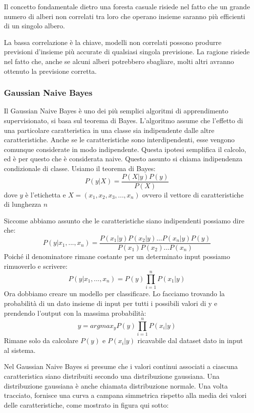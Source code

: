 \documentclass[12pt,italian]{report}
\begin{document}
Il concetto fondamentale dietro una foresta casuale risiede nel fatto che un grande numero di alberi non correlati tra loro che operano insieme saranno più efficienti di un singolo albero.

La bassa correlazione è la chiave, modelli non correlati possono produrre previsioni d'insieme più accurate di qualsiasi singola previsione. La ragione risiede nel fatto che, anche se alcuni alberi potrebbero sbagliare, molti altri avranno ottenuto la previsione corretta.
\subsubsection{Gaussian Naive Bayes}
Il Gaussian Naive Bayes è uno dei più semplici algoritmi di apprendimento supervisionato, si basa sul teorema di Bayes. L'algoritmo assume che l'effetto di una particolare caratteristica in una classe sia indipendente dalle altre caratteristiche. Anche se le caratteristiche sono interdipendenti, esse vengono comunque considerate in modo indipendente. Questa ipotesi semplifica il calcolo, ed è per questo che è considerata naive. Questo assunto si chiama indipendenza condizionale di classe.
Usiamo il teorema di Bayes:
\begin{equation}
P(y | X) = \frac{P(X | y) P(y)}{P(X)}
\end{equation}
dove $y$ è l'etichetta e $X = (x_1, x_2, x_3, ..., x_n)$ ovvero il vettore di caratteristiche di lunghezza $n$

Siccome abbiamo assunto che le caratteristiche siano indipendenti possiamo dire che:
\begin{equation}
P(y| x_1,..., x_n) = \frac{P(x_1|y) P(x_2|y)...P(x_n|y)P(y)}{P(x_1)P(x_2)...P(x_n)}
\end{equation}
Poiché il denominatore rimane costante per un determinato input possiamo rimuoverlo e scrivere:
\begin{equation}
P(y| x_1,..., x_n) = P(y) \prod_{i=1}^{n} P(x_1|y)
\end{equation}
Ora dobbiamo creare un modello per classificare. Lo facciamo trovando la probabilità di un dato insieme di input per tutti i possibili valori di y e prendendo l'output con la massima probabilità:
\begin{equation}
y = argmax_y P(y) \prod_{i=1}^{n} P(x_i|y)
\end{equation}
Rimane solo da calcolare $P(y)$ e $P(x_i|y)$ ricavabile dal dataset dato in input al sistema.

Nel Gaussian Naive Bayes si presume che i valori continui associati a ciascuna caratteristica siano distribuiti secondo una distribuzione gaussiana. Una distribuzione gaussiana è anche chiamata distribuzione normale. Una volta tracciato, fornisce una curva a campana simmetrica rispetto alla media dei valori delle caratteristiche, come mostrato in figura qui sotto:
\end{document}
